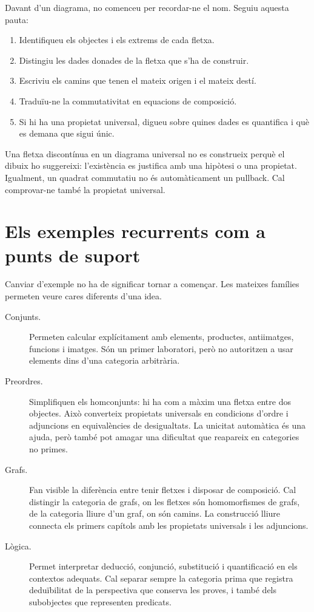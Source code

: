 Davant d'un diagrama, no comenceu per recordar-ne el nom.
Seguiu aquesta pauta:
\begin{enumerate}
  \item Identifiqueu els objectes i els extrems de cada fletxa.
  \item Distingiu les dades donades de la fletxa que s'ha de construir.
  \item Escriviu els camins que tenen el mateix origen i el mateix destí.
  \item Traduïu-ne la commutativitat en equacions de composició.
  \item Si hi ha una propietat universal, digueu sobre quines
        dades es quantifica i què es demana que sigui únic.
\end{enumerate}

Una fletxa discontínua en un diagrama universal no es construeix
perquè el dibuix ho suggereixi: l'existència es justifica amb
una hipòtesi o una propietat. Igualment, un quadrat commutatiu
no és automàticament un pullback. Cal comprovar-ne també la
propietat universal.

\section{Els exemples recurrents com a punts de suport}

Canviar d'exemple no ha de significar tornar a començar.
Les mateixes famílies permeten veure cares diferents d'una idea.

\begin{description}
  \item[Conjunts.] Permeten calcular explícitament amb elements,
        productes, antiimatges, funcions i imatges. Són un
        primer laboratori, però no autoritzen a usar elements
        dins d'una categoria arbitrària.
  \item[Preordres.] Simplifiquen els homconjunts: hi ha com a
        màxim una fletxa entre dos objectes. Això converteix
        propietats universals en condicions d'ordre i adjuncions
        en equivalències de desigualtats. La unicitat automàtica
        és una ajuda, però també pot amagar una dificultat
        que reapareix en categories no primes.
  \item[Grafs.] Fan visible la diferència entre tenir fletxes
        i disposar de composició. Cal distingir la categoria
        de grafs, on les fletxes són homomorfismes de grafs,
        de la categoria lliure d'un graf, on són camins.
        La construcció lliure connecta els primers capítols
        amb les propietats universals i les adjuncions.
  \item[Lògica.] Permet interpretar deducció, conjunció,
        substitució i quantificació en els contextos adequats.
        Cal separar sempre la categoria prima que registra
        deduïbilitat de la perspectiva que conserva les proves,
        i també dels subobjectes que representen predicats.
\end{description}

